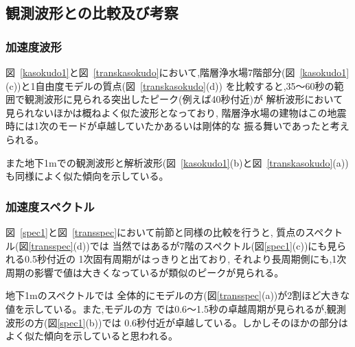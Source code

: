 \documentclass[titlepage]{jsarticle}
\begin{document}
\subsection{観測波形との比較及び考察}

\subsubsection{加速度波形}
図~\ref{kasokudo1}と図~\ref{transkasokudo}において,階層浄水場7階部分(図~\ref{kasokudo1}
(c))と1自由度モデルの質点(図~\ref{transkasokudo}(d))
を比較すると,35〜60秒の範囲で観測波形に見られる突出したピーク(例えば40秒付近)が
解析波形において見られないほかは概ねよく似た波形となっており,
階層浄水場の建物はこの地震時には1次のモードが卓越していたかあるいは剛体的な
振る舞いであったと考えられる。

また地下1mでの観測波形と解析波形(図~\ref{kasokudo1}(b)と図~\ref{transkasokudo}(a))
も同様によく似た傾向を示している。

\subsubsection{加速度スペクトル}
図~\ref{spec1}と図~\ref{transspec}において前節と同様の比較を行うと,
質点のスペクトル(図\ref{transspec}(d))では
当然ではあるが7階のスペクトル(図\ref{spec1}(c))にも見られる0.5秒付近の
1次固有周期がはっきりと出ており,
それより長周期側にも,1次周期の影響で値は大きくなっているが類似のピークが見られる。

地下1mのスペクトルでは
全体的にモデルの方(図\ref{transspec}(a))が2割ほど大きな値を示している。また,モデルの方
では0.6〜1.5秒の卓越周期が見られるが,観測波形の方(図\ref{spec1}(b))では
0.6秒付近が卓越している。しかしそのほかの部分はよく似た傾向を示していると思われる。
\end{document}
